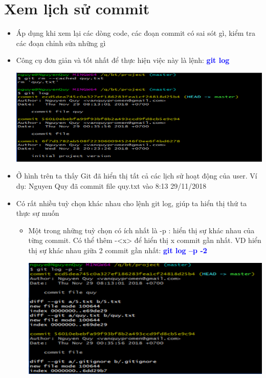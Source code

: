 \documentclass[12pt,a4paper]{report}
\begin{document}
\section{Xem lịch sử commit}
\begin{itemize}
\item Áp dụng khi xem lại các dòng code, các đoạn commit có sai sót gì, kiểm tra các đoạn chỉnh sửa những gì\vskip 0.4cm
\item Công cụ đơn giản và tốt nhất để thực hiện việc này là lệnh: \textcolor{blue}{\bf git log}

	\includegraphics[width=0.8\linewidth]{screenshot017}

	\label{fig:screenshot017}

\item Ở hình trên ta thấy Git đã hiển thị tất cả các lịch sử hoạt động của user. Ví dụ: Nguyen Quy đã commit file quy.txt vào 8:13 29/11/2018\vskip 0.4cm
\item Có rất nhiều tuỳ chọn khác nhau cho lệnh git log, giúp ta hiển thị thứ ta thực sự muốn
	\begin{itemize}
		\item Một trong những tuỳ chọn có ích nhất là -p : hiển thị sự khác nhau của từng commit. Có thể thêm -<x> để hiển thị x commit gần nhất. VD hiển thị sự khác nhau giữa 2 commit gần nhất: \textcolor{blue}{\bf git log –p -2}

	\includegraphics[width=0.8\linewidth]{screenshot018}
	
	\label{fig:screenshot018}


\end{itemize}
\end{itemize}
\end{document}
